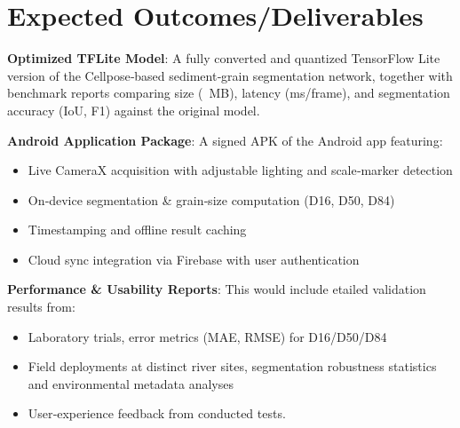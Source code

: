 \documentclass[project-plan]{report-template}
\begin{document}
\section{Expected Outcomes/Deliverables}
\textbf{Optimized TFLite Model}: A fully converted and quantized TensorFlow Lite version of the Cellpose‐based sediment‐grain segmentation network, together with benchmark reports comparing size (~MB), latency (ms/frame), and segmentation accuracy (IoU, F1) against the original model.

\textbf{Android Application Package}: A signed APK of the Android app featuring:

\begin{itemize}
    \item Live CameraX acquisition with adjustable lighting and scale‐marker detection
\end{itemize}

\begin{itemize}
    \item On‐device segmentation \& grain‐size computation (D16, D50, D84)
\end{itemize}

\begin{itemize}
    \item Timestamping and offline result caching
\end{itemize}

\begin{itemize}
    \item Cloud sync integration via Firebase with user authentication
\end{itemize}

\textbf{Performance \& Usability Reports}: This would include etailed validation results from:
\begin{itemize}
    \item Laboratory trials, error metrics (MAE, RMSE) for D16/D50/D84
\end{itemize}

\begin{itemize}
    \item Field deployments at distinct river sites, segmentation robustness statistics and environmental metadata analyses
\end{itemize}

\begin{itemize}
    \item User‐experience feedback from conducted tests.
\end{itemize}
\end{document}
